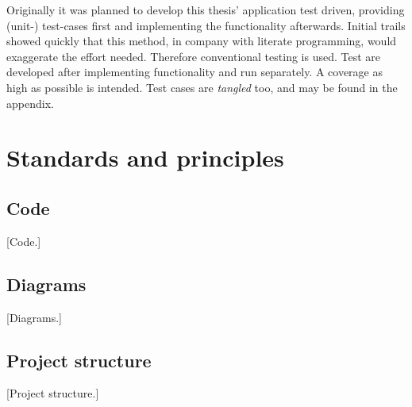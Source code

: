 \documentclass[10pt, openright, notitlepage]{scrreprt}
\begin{document}
\begin{center}
\end{center}

Originally it was planned to develop this thesis' application test driven,
providing (unit-) test-cases first and implementing the functionality
afterwards. Initial trails showed quickly that this method, in company with
literate programming, would exaggerate the effort needed. Therefore conventional
testing is used. Test are developed after implementing functionality and run
separately. A coverage as high as possible is intended. Test cases are \emph{tangled}
too, and may be found in the appendix.
\begin{center}
\end{center}

\section{Standards and principles}
\label{sec:orge461548}
\subsection{Code}
\label{sec:org029fcec}

[Code.]

\subsection{Diagrams}
\label{sec:orgf500ace}

[Diagrams.]

\subsection{Project structure}
\label{sec:org360f7d3}

[Project structure.]
\end{document}
